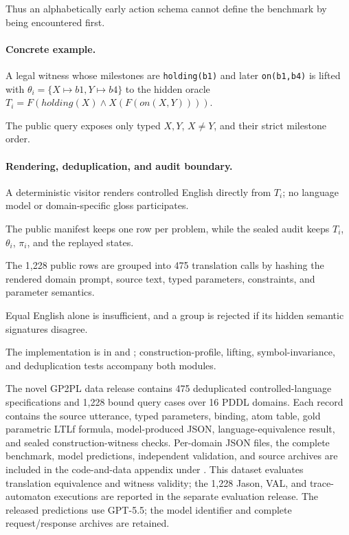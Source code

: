 Thus an alphabetically early action schema cannot define the benchmark by being
encountered first.

\paragraph{Concrete example.}
A legal witness whose milestones are \texttt{holding(b1)} and later
\texttt{on(b1,b4)} is lifted with
$\theta_i=\{X\mapsto b1,Y\mapsto b4\}$ to the hidden oracle
$T_i=F(\mathit{holding}(X)\land X(F(\mathit{on}(X,Y))))$.

The public query exposes only typed $X,Y$, $X\ne Y$, and their strict milestone
order.

\paragraph{Rendering, deduplication, and audit boundary.}
A deterministic visitor renders controlled English directly from $T_i$; no
language model or domain-specific gloss participates.

The public manifest keeps one row per problem, while the sealed audit keeps
$T_i$, $\theta_i$, $\pi_i$, and the replayed states.

The 1,228 public rows are grouped into 475 translation calls by hashing the
rendered domain prompt, source text, typed parameters, constraints, and
parameter semantics.

Equal English alone is insufficient, and a group is rejected if its hidden
semantic signatures disagree.

The implementation is in
 and
; construction-profile,
lifting, symbol-invariance, and deduplication tests accompany both modules.

The novel GP2PL data release contains 475 deduplicated controlled-language
specifications and 1,228 bound query cases over 16 PDDL domains. Each record
contains the source utterance, typed parameters, binding, atom table, gold
parametric LTLf formula, model-produced JSON, language-equivalence result, and
sealed construction-witness checks. Per-domain JSON files, the complete
benchmark, model predictions, independent validation, and source archives are
included in the code-and-data appendix under
. This dataset evaluates
translation equivalence and witness validity; the 1,228 Jason, VAL, and
trace-automaton executions are reported in the separate evaluation release.
The released predictions use GPT-5.5; the model identifier and complete
request/response archives are retained.

